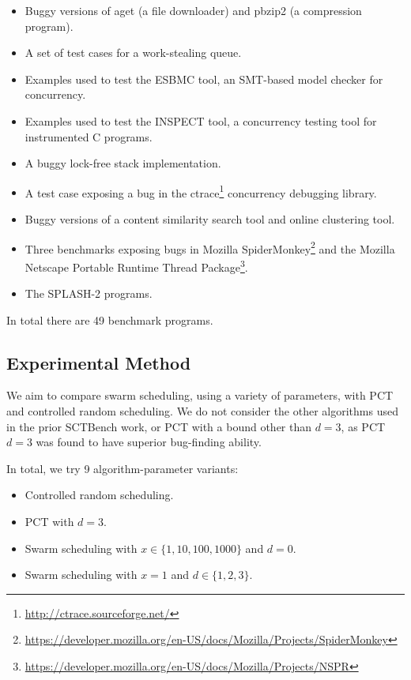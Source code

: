 \begin{itemize}
\item Buggy versions of aget (a file downloader) and pbzip2 (a compression
program).
\item A set of test cases for a work-stealing queue.
\item Examples used to test the ESBMC tool\cite{cordeiro2011}, an SMT-based
model checker for concurrency.
\item Examples used to test the INSPECT tool\cite{yang2008}, a concurrency
testing tool for instrumented C programs.
\item A buggy lock-free stack implementation.
\item A test case exposing a bug in the
ctrace\footnote{\url{http://ctrace.sourceforge.net/}} concurrency debugging
library.
\item Buggy versions of a content similarity search tool and online clustering
tool.
\item Three benchmarks exposing bugs in Mozilla
SpiderMonkey\footnote{\url{https://developer.mozilla.org/en-US/docs/Mozilla/Projects/SpiderMonkey}}
and the Mozilla Net\-scape Portable Runtime Thread Package\footnote{\url{https://developer.mozilla.org/en-US/docs/Mozilla/Projects/NSPR}}.
\item The SPLASH-2 programs\cite{woo1995}.
\end{itemize}

In total there are 49 benchmark programs.

\subsection{Experimental Method}
\label{sec:algorithms-eval-method}

We aim to compare swarm scheduling, using a variety of parameters, with PCT and
controlled random scheduling.  We do not consider the other algorithms used in
the prior SCTBench work, or PCT with a bound other than $d=3$, as PCT $d=3$ was
found to have superior bug-finding ability\cite{thomson2016}.

In total, we try 9 algorithm-parameter variants:

\begin{itemize}
\item Controlled random scheduling.
\item PCT with $d=3$.
\item Swarm scheduling with $x \in \{1,10,100,1000\}$ and $d=0$.
\item Swarm scheduling with $x=1$ and $d \in \{1,2,3\}$.
\end{itemize}

